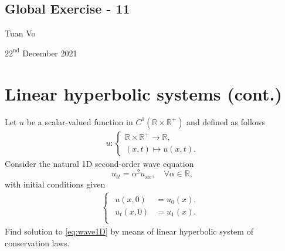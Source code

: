 \documentclass[12pt]{article}
\begin{document}
\begin{center}
	\section*{Global Exercise - 11}
\end{center}
\begin{center}
	Tuan Vo
\end{center}
\begin{center}
	$22^{\text{nd}}$ December 2021
\end{center}
\section{Linear hyperbolic systems (cont.)}
\begin{example}
	Let $u$ be a scalar-valued function in $C^1(\mathbb{R}\times\mathbb{R^+})$ and defined as follows 
	\begin{align}
		u:
		\begin{cases}
			\mathbb{R}\times\mathbb{R^+} \rightarrow \mathbb{R}, \\
			(x,t) \mapsto u(x,t).                                
		\end{cases}
	\end{align}
	Consider the natural 1D second-order wave equation 
	\begin{equation}\label{eq:wave1D}
		u_{tt} = \alpha^2 u_{xx},\quad \forall\alpha\in\mathbb{R}, 
	\end{equation}
	with initial conditions given 
	\begin{align}
		\begin{cases}
			\begin{aligned}
				u(x,0)     & = u_{0}(x), \\
				u_{t}(x,0) & = u_{1}(x). \\
			\end{aligned}
		\end{cases}
	\end{align}
	Find solution to \eqref{eq:wave1D} by means of linear hyperbolic system of conservation laws.
\end{example}
\end{document}
